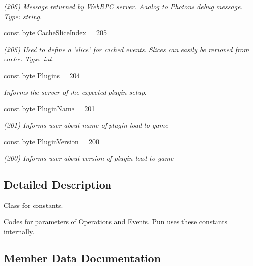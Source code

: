 \begin{DoxyCompactItemize}
\begin{DoxyCompactList}\small\item\em (206) Message returned by Web\+R\+PC server. Analog to \hyperlink{namespace_exit_games_1_1_client_1_1_photon}{Photon}\textquotesingle{}s debug message. Type\+: string.\end{DoxyCompactList}\item 
const byte \hyperlink{class_exit_games_1_1_client_1_1_photon_1_1_parameter_code_adb42ad64e327b8226f09f99b470a525d}{Cache\+Slice\+Index} = 205
\begin{DoxyCompactList}\small\item\em (205) Used to define a \char`\"{}slice\char`\"{} for cached events. Slices can easily be removed from cache. Type\+: int.\end{DoxyCompactList}\item 
const byte \hyperlink{class_exit_games_1_1_client_1_1_photon_1_1_parameter_code_a3d221707fef5b7a3f98507d7376d008f}{Plugins} = 204
\begin{DoxyCompactList}\small\item\em Informs the server of the expected plugin setup. \end{DoxyCompactList}\item 
const byte \hyperlink{class_exit_games_1_1_client_1_1_photon_1_1_parameter_code_a347bdffcd091fd5db0ac8eb8612cd7ad}{Plugin\+Name} = 201
\begin{DoxyCompactList}\small\item\em (201) Informs user about name of plugin load to game\end{DoxyCompactList}\item 
const byte \hyperlink{class_exit_games_1_1_client_1_1_photon_1_1_parameter_code_a7e1a62d2c1df9bb4b8c013e6a8e3c42f}{Plugin\+Version} = 200
\begin{DoxyCompactList}\small\item\em (200) Informs user about version of plugin load to game\end{DoxyCompactList}\end{DoxyCompactItemize}


\subsection{Detailed Description}
Class for constants. 

Codes for parameters of Operations and Events. Pun uses these constants internally. 

\subsection{Member Data Documentation}
